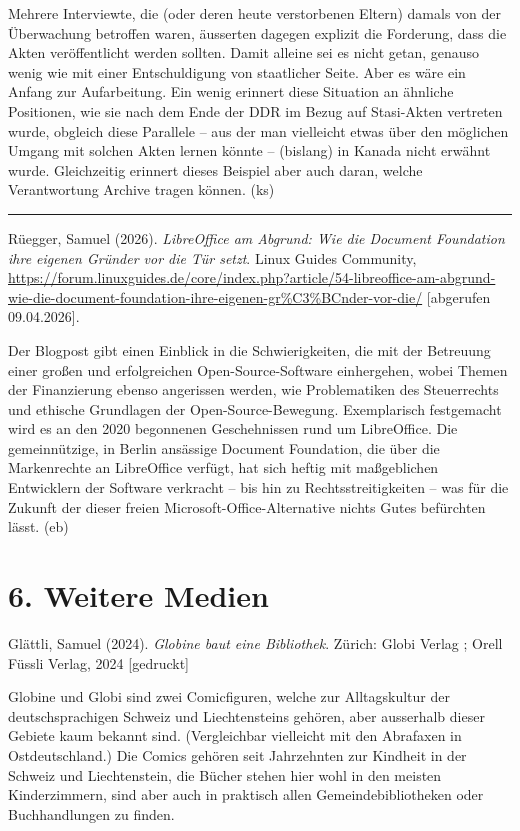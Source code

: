 \documentclass[a4paper,
fontsize=11pt,
oneside,
numbers=noperiodatend,
parskip=half-,
bibliography=totoc,
final
]{scrartcl}
\begin{document}
Mehrere Interviewte, die (oder deren heute verstorbenen Eltern) damals
von der Überwachung betroffen waren, äusserten dagegen explizit die
Forderung, dass die Akten veröffentlicht werden sollten. Damit alleine
sei es nicht getan, genauso wenig wie mit einer Entschuldigung von
staatlicher Seite. Aber es wäre ein Anfang zur Aufarbeitung. Ein wenig
erinnert diese Situation an ähnliche Positionen, wie sie nach dem Ende
der DDR im Bezug auf Stasi-Akten vertreten wurde, obgleich diese
Parallele -- aus der man vielleicht etwas über den möglichen Umgang mit
solchen Akten lernen könnte -- (bislang) in Kanada nicht erwähnt wurde.
Gleichzeitig erinnert dieses Beispiel aber auch daran, welche
Verantwortung Archive tragen können. (ks)

\begin{center}\rule{0.5\linewidth}{0.5pt}\end{center}

Rüegger, Samuel (2026). \emph{LibreOffice am Abgrund: Wie die Document
Foundation ihre eigenen Gründer vor die Tür setzt}. Linux Guides
Community,
\url{https://forum.linuxguides.de/core/index.php?article/54-libreoffice-am-abgrund-wie-die-document-foundation-ihre-eigenen-gr\%C3\%BCnder-vor-die/}
{[}abgerufen 09.04.2026{]}.

Der Blogpost gibt einen Einblick in die Schwierigkeiten, die mit der
Betreuung einer großen und erfolgreichen Open-Source-Software
einhergehen, wobei Themen der Finanzierung ebenso angerissen werden, wie
Problematiken des Steuerrechts und ethische Grundlagen der
Open-Source-Bewegung. Exemplarisch festgemacht wird es an den 2020
begonnenen Geschehnissen rund um LibreOffice. Die gemeinnützige, in
Berlin ansässige Document Foundation, die über die Markenrechte an
LibreOffice verfügt, hat sich heftig mit maßgeblichen Entwicklern der
Software verkracht -- bis hin zu Rechtsstreitigkeiten -- was für die
Zukunft der dieser freien Microsoft-Office-Alternative nichts Gutes
befürchten lässt. (eb)

\section{6. Weitere Medien}\label{weitere-medien}

Glättli, Samuel (2024). \emph{Globine baut eine Bibliothek}. Zürich:
Globi Verlag ; Orell Füssli Verlag, 2024 {[}gedruckt{]}

Globine und Globi sind zwei Comicfiguren, welche zur Alltagskultur der
deutschsprachigen Schweiz und Liechtensteins gehören, aber ausserhalb
dieser Gebiete kaum bekannt sind. (Vergleichbar vielleicht mit den
Abrafaxen in Ostdeutschland.) Die Comics gehören seit Jahrzehnten zur
Kindheit in der Schweiz und Liechtenstein, die Bücher stehen hier wohl
in den meisten Kinderzimmern, sind aber auch in praktisch allen
Gemeindebibliotheken oder Buchhandlungen zu finden.
\end{document}
